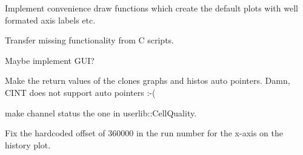 
\begin{DoxyRefList}
\item[\label{todo__todo000007}%
\hypertarget{todo__todo000007}{}%
page \hyperlink{index}{Dead and Noisy Channels Analysis for C\-A\-L\-I\-C\-E Test Beam} ]Implement convenience draw functions which create the default plots with well formated axis labels etc. 

Transfer missing functionality from C scripts. 

Maybe implement G\-U\-I? 
\item[\label{todo__todo000001}%
\hypertarget{todo__todo000001}{}%
Class \hyperlink{class_run_comparator}{Run\-Comparator} ]Make the return values of the clones graphs and histos auto pointers. Damn, C\-I\-N\-T does not support auto pointers \-:-\/(  
\item[\label{todo__todo000005}%
\hypertarget{todo__todo000005}{}%
Page \hyperlink{create_bad_channels_list_exe}{The create\-Bad\-Channels\-List executable} ]make channel status the one in userlib\-::\-Cell\-Quality.

Fix the hardcoded offset of 360000 in the run number for the x-\/axis on the history plot.
\end{DoxyRefList}